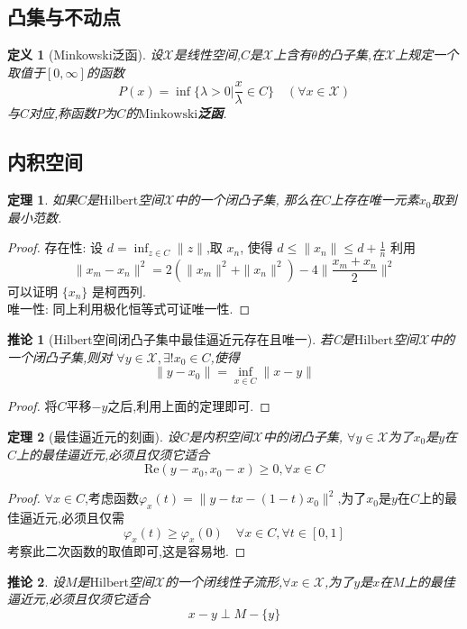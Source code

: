 \documentclass[12pt,a4paper]{article}
\newtheorem{thm}{定理}[subsection]  %
\newtheorem{corollary}{推论}[subsection] %
\newtheorem{definition}{定义}[subsection] %
\begin{document}
\subsection{凸集与不动点}
\begin{definition}[Minkowski泛函]
    设$\mathscr{X}$是线性空间,$C$是$\mathscr{X}$上含有$\theta$的凸子集,在$\mathscr{X}$上规定一个取值于$[0,\infty]$的函数
    \[P(x) = \inf\{\lambda > 0 |\frac{x}{\lambda} \in C\} \quad (\forall x \in \mathscr{X})\]
    与$C$对应,称函数$P$为$C$的\textbf{$\mathrm{Minkowski}$泛函}.
\end{definition}

\subsection{内积空间}

\begin{thm}
    如果$C$是$\mathrm{Hilbert}$空间$\mathscr{X}$中的一个闭凸子集,
    那么在$C$上存在唯一元素$x_0$取到最小范数.
\end{thm}
\begin{proof}
    存在性: 设 $d= \inf_{z \in C}\|z\|$,取 $x_n$, 使得 $d\leq \|x_n\|\leq d + \frac{1}{n}$ 利用
    \[\|x_m - x_n\|^2 = 2(\|x_m\|^2+\|x_n\|^2)-4\|\frac{x_m + x_n}{2}\|^2\]
    可以证明 $\{x_n\}$ 是柯西列.\\
    唯一性: 同上利用极化恒等式可证唯一性.
\end{proof}
\begin{corollary}[$\mathrm{Hilbert}$空间闭凸子集中最佳逼近元存在且唯一]
    若C是$\mathrm{Hilbert}$空间$\mathscr{X}$中的一个闭凸子集,则对
    $\forall y \in \mathscr{X},\exists !x_0 \in C$,使得\[\|y-x_0\| = \inf_{x\in C}\|x-y\|\]
\end{corollary}
\begin{proof}
    将$C$平移$-y$之后,利用上面的定理即可.
\end{proof}
\begin{thm}[最佳逼近元的刻画]
    设$C$是内积空间$\mathscr{X}$中的闭凸子集, $\forall y \in \mathscr{X}$为了$x_0$是$y$在$C$上的最佳逼近元,必须且仅须它适合
    \[\mathrm{Re}(y-x_0,x_0-x)\geq 0,\forall x \in C\]
\end{thm}
\begin{proof}
    $\forall x \in C$,考虑函数$\varphi_x(t) = \|y-tx-(1-t)x_0\|^2$,为了$x_0$是$y$在$C$上的最佳逼近元,必须且仅需
    \[\varphi_x(t)\geq\varphi_x(0) \quad \forall x \in C ,\forall t \in[0,1]\]
    考察此二次函数的取值即可,这是容易地.
\end{proof}
\begin{corollary}
    设$M$是$\mathrm{Hilbert}$空间$\mathscr{X}$的一个闭线性子流形,$\forall x \in \mathscr{X}$,为了$y$是$x$在$M$上的最佳逼近元,必须且仅须它适合
    \[x-y \perp M-\{y\} \]
\end{corollary}
\end{document}
